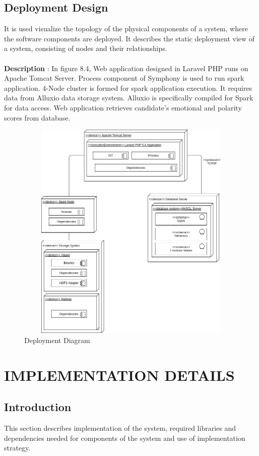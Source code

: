 \documentclass[oneside,a4paper,12pt]{pictreport}
\begin{document}
\section{Deployment Design}
 It is used visualize the topology of the physical components of a system, where the software components are deployed. It describes the static deployment view of a system, consisting of nodes and their relationships.\\\\
 \textbf{Description} : In figure 8.4, Web application designed in Laravel PHP runs on Apache Tomcat Server. Process component of Symphony is used to run spark application. 4-Node cluster is formed for spark application execution. It requires data from Alluxio data storage system. Alluxio is specifically compiled for Spark for data access. Web application retrieves candidate's emotional and polarity scores from database.
\begin{figure}[h!]
\includegraphics[width=5.2in,height=4.2in]{Deployment.jpg}
\caption{Deployment Diagram}
\end{figure}

\chapter{IMPLEMENTATION DETAILS}
\section{Introduction}
This section describes implementation of the system, required libraries and dependencies needed for components of the system and use of implementation strategy.
\end{document}

